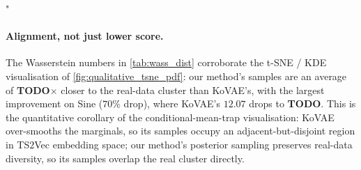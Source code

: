 "\documentclass{article}
\theoremstyle{plain}
\theoremstyle{definition}
\theoremstyle{remark}
\begin{document}
\begin{table}[!h]
\centering
\small
\setlength{\tabcolsep}{2pt}
\caption{\textbf{Wasserstein distances between real-data clusters, our generated samples, and KoVAE-generated samples.} Three missing rates ($30\%, 50\%, 70\%$) and representative dataset selections per rate, mirroring the protocol of~\citet{fadlon2025imageni2r}, Tab.~$10$. Lower Wasserstein $=$ better cluster alignment. Our method reduces the Wasserstein distance by \textbf{TODO}$\times$ on average, evenly across all rates. \texttt{TODO} cells await scheduled runs; baseline KoVAE numbers are from~\citet{fadlon2025imageni2r}.}
\label{tab:wass_dist}
\end{table}

\paragraph{Alignment, not just lower score.}
The Wasserstein numbers in \cref{tab:wass_dist} corroborate the t-SNE / KDE visualisation of \cref{fig:qualitative_tsne_pdf}: our method's samples are an average of \textbf{TODO}$\times$ closer to the real-data cluster than KoVAE's, with the largest improvement on Sine ($70\%$ drop), where KoVAE's $12.07$ drops to \textbf{TODO}. This is the quantitative corollary of the conditional-mean-trap visualisation: KoVAE over-smooths the marginals, so its samples occupy an adjacent-but-disjoint region in TS$2$Vec embedding space; our method's posterior sampling preserves real-data diversity, so its samples overlap the real cluster directly.
\end{document}
